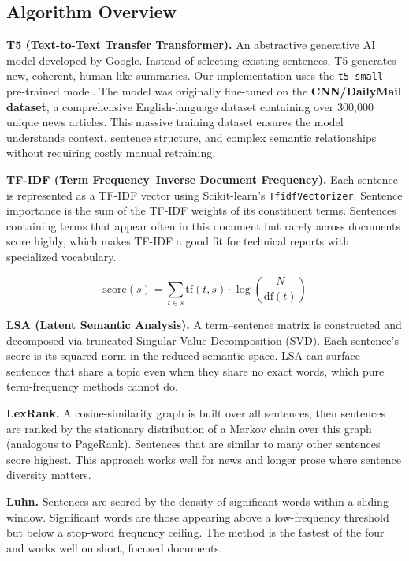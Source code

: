 \documentclass[12pt,a4paper]{article}
\begin{document}
\subsection{Algorithm Overview}

\textbf{T5 (Text-to-Text Transfer Transformer).} An abstractive generative AI model developed by Google. Instead of selecting existing sentences, T5 generates new, coherent, human-like summaries. Our implementation uses the \texttt{t5-small} pre-trained model. The model was originally fine-tuned on the \textbf{CNN/DailyMail dataset}, a comprehensive English-language dataset containing over 300,000 unique news articles. This massive training dataset ensures the model understands context, sentence structure, and complex semantic relationships without requiring costly manual retraining.

\textbf{TF-IDF (Term Frequency--Inverse Document Frequency).} Each sentence is represented as a TF-IDF vector using Scikit-learn's \texttt{TfidfVectorizer}. Sentence importance is the sum of the TF-IDF weights of its constituent terms. Sentences containing terms that appear often in this document but rarely across documents score highly, which makes TF-IDF a good fit for technical reports with specialized vocabulary.

\begin{equation}
  \text{score}(s) = \sum_{t \in s} \text{tf}(t,s) \cdot \log\!\left(\frac{N}{\text{df}(t)}\right)
\end{equation}

\textbf{LSA (Latent Semantic Analysis).} A term--sentence matrix is constructed and decomposed via truncated Singular Value Decomposition (SVD). Each sentence's score is its squared norm in the reduced semantic space. LSA can surface sentences that share a topic even when they share no exact words, which pure term-frequency methods cannot do.

\textbf{LexRank.} A cosine-similarity graph is built over all sentences, then sentences are ranked by the stationary distribution of a Markov chain over this graph (analogous to PageRank). Sentences that are similar to many other sentences score highest. This approach works well for news and longer prose where sentence diversity matters.

\textbf{Luhn.} Sentences are scored by the density of significant words within a sliding window. Significant words are those appearing above a low-frequency threshold but below a stop-word frequency ceiling. The method is the fastest of the four and works well on short, focused documents.
\end{document}
